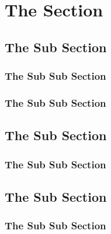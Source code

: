\section{The Section}

\blindtext

\subsection{The Sub Section}

\blindtext

\subsubsection{The Sub Sub Section}

\blindtext

\subsubsection{The Sub Sub Section}

\blindtext

\subsection{The Sub Section}

\blindtext

\subsubsection{The Sub Sub Section}

\blindtext

\subsection{The Sub Section}

\subsubsection{The Sub Sub Section}

\blindtext
